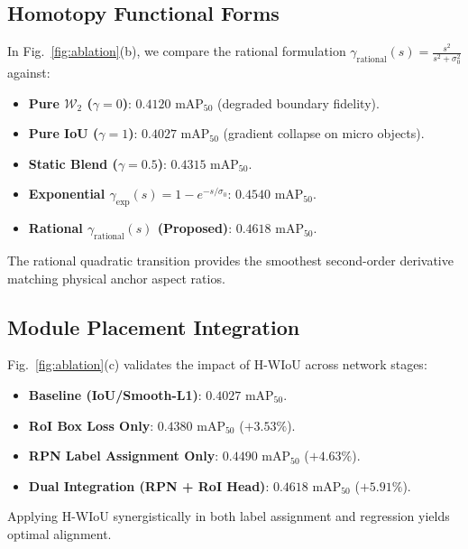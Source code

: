 \documentclass[10pt,twocolumn]{article}
\begin{document}
\subsection{Homotopy Functional Forms}
In Fig.~\ref{fig:ablation}(b), we compare the rational formulation $\gamma_{\text{rational}}(s) = \frac{s^2}{s^2+\sigma_0^2}$ against:
\begin{itemize}
    \item \textbf{Pure $\mathcal{W}_2$ ($\gamma=0$)}: $0.4120\text{ mAP}_{50}$ (degraded boundary fidelity).
    \item \textbf{Pure IoU ($\gamma=1$)}: $0.4027\text{ mAP}_{50}$ (gradient collapse on micro objects).
    \item \textbf{Static Blend ($\gamma=0.5$)}: $0.4315\text{ mAP}_{50}$.
    \item \textbf{Exponential $\gamma_{\text{exp}}(s) = 1 - e^{-s/\sigma_0}$}: $0.4540\text{ mAP}_{50}$.
    \item \textbf{Rational $\gamma_{\text{rational}}(s)$ (Proposed)}: $\mathbf{0.4618}\text{ mAP}_{50}$.
\end{itemize}
The rational quadratic transition provides the smoothest second-order derivative matching physical anchor aspect ratios.

\subsection{Module Placement Integration}
Fig.~\ref{fig:ablation}(c) validates the impact of H-WIoU across network stages:
\begin{itemize}
    \item \textbf{Baseline (IoU/Smooth-L1)}: $0.4027\text{ mAP}_{50}$.
    \item \textbf{RoI Box Loss Only}: $0.4380\text{ mAP}_{50}$ ($+3.53\%$).
    \item \textbf{RPN Label Assignment Only}: $0.4490\text{ mAP}_{50}$ ($+4.63\%$).
    \item \textbf{Dual Integration (RPN + RoI Head)}: $\mathbf{0.4618}\text{ mAP}_{50}$ ($\mathbf{+5.91\%}$).
\end{itemize}
Applying H-WIoU synergistically in both label assignment and regression yields optimal alignment.
\end{document}
